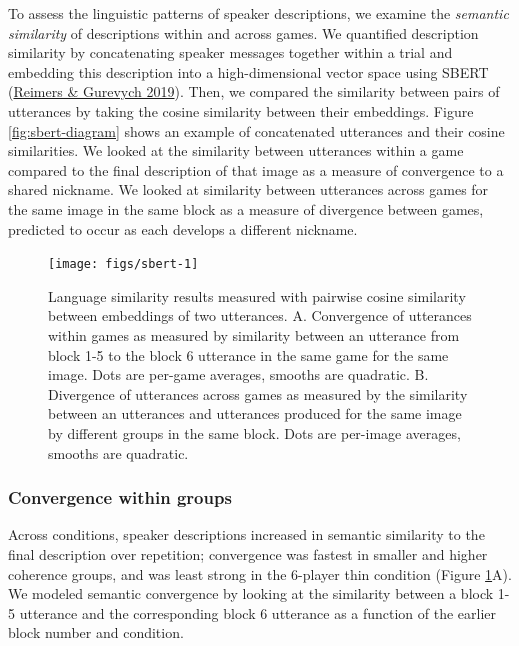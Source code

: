 \documentclass[
  english,
  a4paper,
]{article}
\begin{document}
To assess the linguistic patterns of speaker descriptions, we examine the \emph{semantic similarity} of descriptions within and across games. We quantified description similarity by concatenating speaker messages together within a trial and embedding this description into a high-dimensional vector space using SBERT (\protect\hyperlink{ref-reimers2019}{Reimers \& Gurevych 2019}). Then, we compared the similarity between pairs of utterances by taking the cosine similarity between their embeddings. Figure \ref{fig:sbert-diagram} shows an example of concatenated utterances and their cosine similarities. We looked at the similarity between utterances within a game compared to the final description of that image as a measure of convergence to a shared nickname. We looked at similarity between utterances across games for the same image in the same block as a measure of divergence between games, predicted to occur as each develops a different nickname.

\begin{figure}[t!]

{\centering \texttt{[image: figs/sbert-1]} 

}

\caption{Language similarity results measured with pairwise cosine similarity between embeddings of two utterances. A. Convergence of utterances within games as measured by similarity between an utterance from block 1-5 to the block 6 utterance in the same game for the same image. Dots are per-game averages, smooths are quadratic. B. Divergence of utterances across games as measured by the similarity between an utterances and utterances produced for the same image by different groups in the same block. Dots are per-image averages, smooths are quadratic.}\label{fig:sbert}
\end{figure}

\hypertarget{convergence-within-groups}{%
\subsubsection{Convergence within groups}\label{convergence-within-groups}}

Across conditions, speaker descriptions increased in semantic similarity to the final description over repetition; convergence was fastest in smaller and higher coherence groups, and was least strong in the 6-player thin condition (Figure \ref{fig:sbert}A). We modeled semantic convergence by looking at the similarity between a block 1-5 utterance and the corresponding block 6 utterance as a function of the earlier block number and condition.
\end{document}
